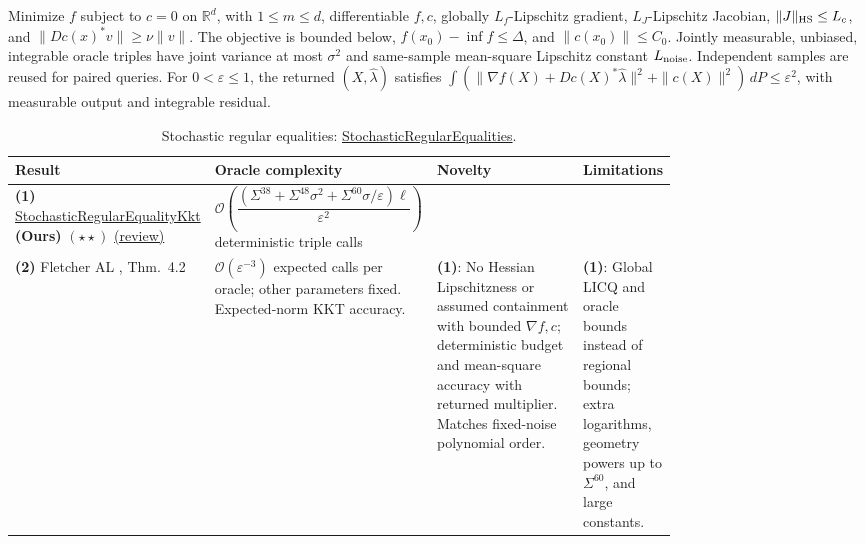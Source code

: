 \begin{table}[tp]
\centering
\caption{Stochastic regular equalities: \href{https://github.com/k3nfalt/longtails/blob/main/LongTails/Setups/StochasticRegularEqualities.lean}{StochasticRegularEqualities}.}\label{tab:StochasticRegularEqualities}
\parbox{\linewidth}{\footnotesize Minimize $f$ subject to $c=0$ on $\mathbb R^d$, with $1\le m\le d$, differentiable $f,c$, globally $L_f$-Lipschitz gradient, $L_J$-Lipschitz Jacobian, $\|J\|_{\rm HS}\le L_c$, and $\|Dc(x)^*v\|\ge\nu\|v\|$. The objective is bounded below, $f(x_0)-\inf f\le\Delta$, and $\|c(x_0)\|\le C_0$. Jointly measurable, unbiased, integrable oracle triples have joint variance at most $\sigma^2$ and same-sample mean-square Lipschitz constant $L_{\rm noise}$. Independent samples are reused for paired queries. For $0<\varepsilon\le1$, the returned $(X,\widehat\lambda)$ satisfies $\int(\|\nabla f(X)+Dc(X)^*\widehat\lambda\|^2+\|c(X)\|^2)\,dP\le\varepsilon^2$, with measurable output and integrable residual.}\par\smallskip
\begin{threeparttable}
\footnotesize
\setlength{\tabcolsep}{4pt}\renewcommand{\arraystretch}{1.25}
\begin{tabularx}{\linewidth}{@{}>{\raggedright\arraybackslash}p{0.20\linewidth}>{\raggedright\arraybackslash}p{0.32\linewidth}>{\raggedright\arraybackslash}p{0.25\linewidth}>{\raggedright\arraybackslash}X@{}}
\toprule
\textbf{Result} & \textbf{Oracle complexity} & \textbf{Novelty} & \textbf{Limitations} \\
\midrule
\textbf{(1)} \href{https://github.com/k3nfalt/longtails/blob/main/LongTails/Theorems/StochasticRegularEqualityKkt.lean}{Stochastic\allowbreak Regular\allowbreak Equality\allowbreak Kkt} \textbf{(Ours)} $(\star\star)$ \href{https://github.com/k3nfalt/longtails/blob/main/scripts/reviews/StochasticRegularEqualityKkt.md}{(review)} & $\mathcal{O}\!\left(\dfrac{(\Sigma^{38}+\Sigma^{48}\sigma^2+\Sigma^{60}\sigma/\varepsilon)\ell}{\varepsilon^2}\right)$ deterministic triple calls & & \\
\midrule[1.2pt]
\textbf{(2)} Fletcher AL \citep{cui2026fletcherV1}, Thm.~4.2 & $\mathcal{O}(\varepsilon^{-3})$ expected calls per oracle; other parameters fixed. Expected-norm KKT accuracy. & \textbf{(1)}: No Hessian Lipschitzness or assumed containment with bounded $\nabla f,c$; deterministic budget and mean-square accuracy with returned multiplier. Matches fixed-noise polynomial order. & \textbf{(1)}: Global LICQ and oracle bounds instead of regional bounds; extra logarithms, geometry powers up to $\Sigma^{60}$, and large constants. \\

\end{tabularx}
\end{threeparttable}
\end{table}
